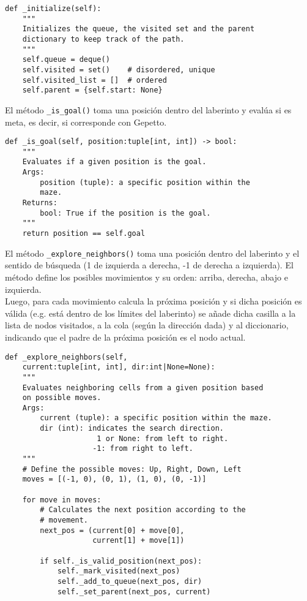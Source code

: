 \begin{lstlisting}
def _initialize(self):
    """
    Initializes the queue, the visited set and the parent
    dictionary to keep track of the path.
    """
    self.queue = deque()
    self.visited = set()    # disordered, unique
    self.visited_list = []  # ordered
    self.parent = {self.start: None}
\end{lstlisting}
El método \lstinline{_is_goal()} toma una posición dentro del laberinto y evalúa si es meta, es decir, si corresponde con Gepetto.\\
\begin{lstlisting}
def _is_goal(self, position:tuple[int, int]) -> bool:
    """
    Evaluates if a given position is the goal.
    Args:
        position (tuple): a specific position within the
        maze.
    Returns:
        bool: True if the position is the goal.
    """
    return position == self.goal
\end{lstlisting}
\clearpage
El método \lstinline{_explore_neighbors()} toma una posición dentro del laberinto y el sentido de búsqueda (1 de izquierda a derecha, -1 de derecha a izquierda). El método define los posibles movimientos y su orden: arriba, derecha, abajo e izquierda.
\\\newline
Luego, para cada movimiento calcula la próxima posición y si dicha posición es válida (e.g. está dentro de los límites del laberinto) se añade dicha casilla a la lista de nodos visitados, a la cola (según la dirección dada) y al diccionario, indicando que el padre de la próxima posición es el nodo actual.\\
\begin{lstlisting}
def _explore_neighbors(self,
    current:tuple[int, int], dir:int|None=None):
    """
    Evaluates neighboring cells from a given position based
    on possible moves.
    Args:
        current (tuple): a specific position within the maze.
        dir (int): indicates the search direction.
                     1 or None: from left to right.
                    -1: from right to left.
    """
    # Define the possible moves: Up, Right, Down, Left
    moves = [(-1, 0), (0, 1), (1, 0), (0, -1)]

    for move in moves:
        # Calculates the next position according to the
        # movement.
        next_pos = (current[0] + move[0],
                    current[1] + move[1])

        if self._is_valid_position(next_pos):
            self._mark_visited(next_pos)
            self._add_to_queue(next_pos, dir)
            self._set_parent(next_pos, current)
\end{lstlisting}
